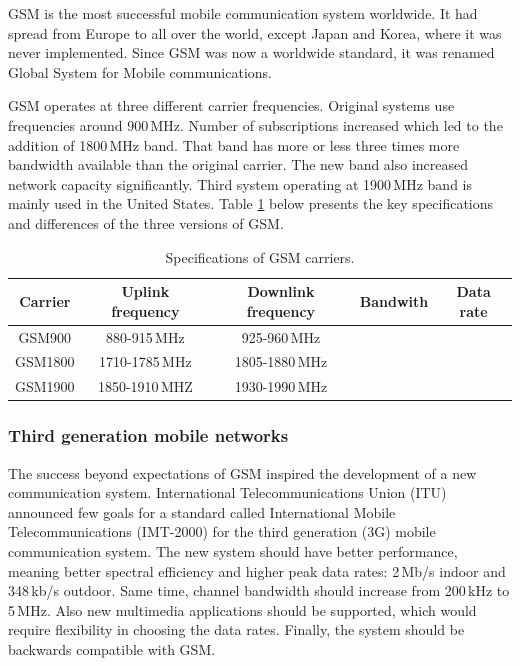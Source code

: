GSM is the most successful mobile communication system worldwide. It had spread from Europe to all over the world, except Japan and Korea, where it was never implemented. Since GSM was now a worldwide standard, it was renamed Global System for Mobile communications. \cite{molisch}

GSM operates at three different carrier frequencies. Original systems use frequencies around 900\,MHz. Number of subscriptions increased which led to the addition of 1800\,MHz band. That band has more or less three times more bandwidth available than the original carrier. The new band also increased network capacity significantly. Third system operating at 1900\,MHz band is mainly used in the United States.  Table \ref{tab:gsm} below presents the key specifications and differences of the three versions of GSM. \cite{molisch}

\begin{table}[H]
    \centering
    \caption{Specifications of GSM carriers.} %
    \label{tab:gsm}
    \begin{tabular}{|c|c|c|c|c|}
        \hline
         Carrier & Uplink frequency & Downlink frequency & Bandwith & Data rate \\%
         \hline
         GSM900 & 880-915\,MHz & 925-960\,MHz & & \\
         \hline
         GSM1800 & 1710-1785\,MHz & 1805-1880\,MHz & & \\
         \hline
         GSM1900 & 1850-1910\,MHZ & 1930-1990\,MHz & & \\
         \hline
    \end{tabular}
\end{table}

\subsubsection{Third generation mobile networks}
\label{sec:3g}
The success beyond expectations of GSM inspired the development of a new communication system. International Telecommunications Union (ITU) announced few goals for a standard called International Mobile Telecommunications (IMT-2000) for the third generation (3G) mobile communication system. The new system should have better performance, meaning better spectral efficiency and higher peak data rates: 2\,Mb/s indoor and 348\,kb/s outdoor. Same time, channel bandwidth should increase from 200\,kHz to 5\,MHz. Also new multimedia applications should be supported, which would require flexibility in choosing the data rates. Finally, the system should be backwards compatible with GSM. \cite{molisch}

